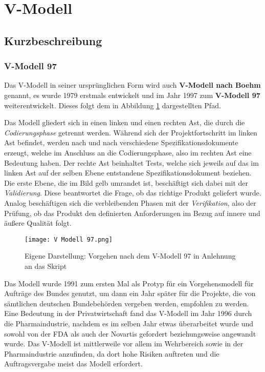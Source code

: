 \section{V-Modell}

\subsection{Kurzbeschreibung}
\subsubsection{V-Modell 97}
Das V-Modell in seiner ursprünglichen Form wird auch \textbf{V-Modell nach Boehm} genannt, es wurde 1979 erstmals entwickelt und im Jahr 1997 zum \textbf{V-Modell 97} weiterentwickelt. Dieses folgt dem in Abbildung \ref{abbildung_VModell97} dargestellten Pfad.

Das Modell gliedert sich in einen linken und einen rechten Ast, die durch die \textit{Codierungsphase} getrennt werden. Während sich der Projektfortschritt im linken Ast befindet, werden nach und nach verschiedene Spezifikationsdokumente erzeugt, welche im Anschluss an die Codierungsphase, also im rechten Ast eine Bedeutung haben. Der rechte Ast beinhaltet Tests, welche sich jeweils auf das im linken Ast auf der selben Ebene entstandene Spezifikationsdokument beziehen. Die erste Ebene, die im Bild gelb umrandet ist, beschäftigt sich dabei mit der \textit{Validierung}. Diese beantwortet die Frage, ob das richtige Produkt geliefert wurde. Analog beschäftigen sich die verbleibenden Phasen mit der \textit{Verifikation}, also der Prüfung, ob das Produkt den definierten Anforderungen im Bezug auf innere und äußere Qualität folgt.

\begin{figure}[H]
    \centering
    \texttt{[image: V Modell 97.png]}
    \caption[Vorgehen nach dem V-Modell 97]{Eigene Darstellung: Vorgehen nach dem V-Modell 97 in Anlehnung an das Skript}
    \label{abbildung_VModell97}
\end{figure}

Das Modell wurde 1991 zum ersten Mal als Protyp für ein Vorgehensmodell für Aufträge des Bundes genutzt, um dann ein Jahr später für die Projekte, die von sämtlichen deutschen Bundebehörden vergeben werden, empfohlen zu werden. Eine Bedeutung in der Privatwirtschaft fand das V-Modell im Jahr 1996 durch die Pharmaindustrie, nachdem es im selben Jahr etwas überarbeitet wurde und sowohl von der FDA als auch der Novartis gefordert beziehungsweise angewandt wurde. Das V-Modell ist mittlerweile vor allem im Wehrbereich sowie in der Pharmaindustrie anzufinden, da dort hohe Risiken auftreten und die Auftragsvergabe meist das Modell erfordert.

